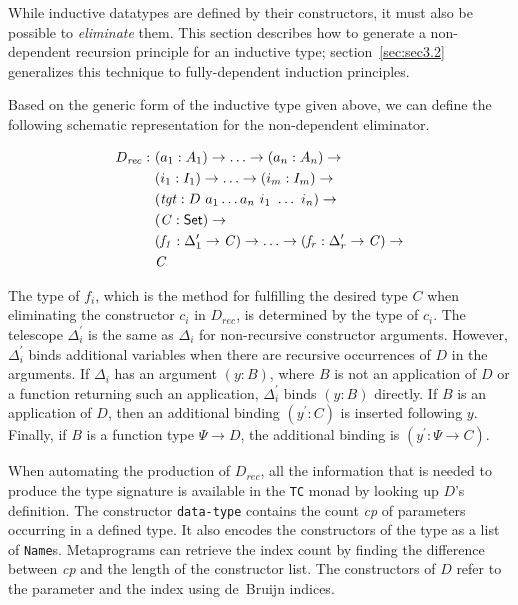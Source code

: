\documentclass[sigplan,10pt]{acmart}
\begin{document}

While inductive datatypes are defined by their constructors, it must also be possible to \emph{eliminate} them. This section describes how to generate a non-dependent recursion principle for an inductive type; section~\ref{sec:sec3.2} generalizes this technique to fully-dependent induction principles.

Based on the generic form of the inductive type given above, we can define the following schematic representation for the non-dependent eliminator.

\begin{align*}
D_{\mathit{rec}} :\ & (a_1 : A_1) \to \ldots \to (a_n : A_n) \to\\
& (i_1 : I_1) \to \ldots \to (i_m : I_m) \to\\
& (\mathit{tgt} : D\ a_1 \ldots a_n\ i_1\ \ldots\ i_n) \to\\
& (\mathit{C} : \textsf{Set}{}) \to \\
& (\mathit{f_1} : \Delta_1^\prime \to \mathit{C}) \to \ldots \to (\mathit{f_r} : \Delta_r^\prime \to \mathit{C}) \to \\
& \mathit{C}
\end{align*}

The type of $f_i$, which is the method for fulfilling the desired type $C$ when eliminating the constructor $c_i$ in $D_\mathit{rec}$, is determined by the type of $c_i$.
The telescope $\Delta_i^\prime$ is the same as $\Delta_i$ for non-recursive constructor arguments.
However, $\Delta_i^\prime$ binds additional variables when there are recursive occurrences of $D$ in the arguments.
If $\Delta_i$ has an argument $(y : B)$, where $B$ is not an application of $D$ or a function returning such an application, $\Delta_i^\prime$ binds $(y : B)$ directly.
If $B$ is an application of $D$, then an additional binding $(y^\prime : C)$ is inserted following $y$.
Finally, if $B$ is a function type $\Psi \to D$, the additional binding is $(y^\prime : \Psi \to C)$. 


When automating the production of $D_{\mathit{rec}}$, all the information that is needed to produce the type signature is available in the \texttt{TC} monad by looking up $D$'s definition.
The constructor {\tt data-type} contains the count \emph{cp} of parameters occurring in a defined type. It also encodes the constructors of the type as a list of \texttt{Name}s. Metaprograms can retrieve the index count by finding the difference between \emph{cp} and the length of the constructor list. The constructors of $D$ refer to the parameter and the index using de~Bruijn indices.
\end{document}
